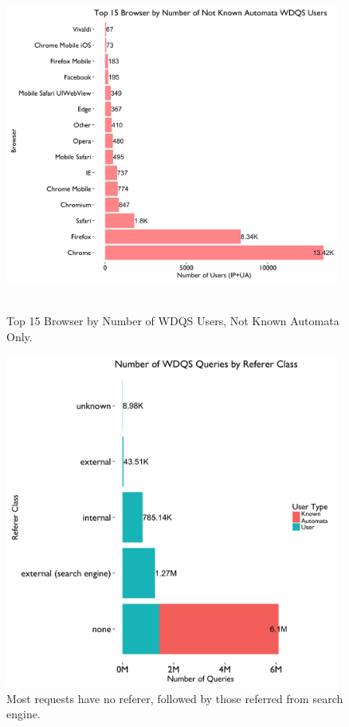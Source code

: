 \documentclass[12pt,]{article}
\begin{document}
\begin{figure}[H]
\centering
\includegraphics[width=11cm,height=11cm,keepaspectratio]{figures/n_user_by_browser.png}
\caption{Top 15 Browser by Number of WDQS Users, Not Known Automata
Only.}
\end{figure}

\begin{figure}[H]
\centering
\includegraphics[width=11cm,height=11cm,keepaspectratio]{figures/n_query_by_referer_class.png}
\caption{Most requests have no referer, followed by those referred from
search engine.}
\end{figure}
\end{document}
